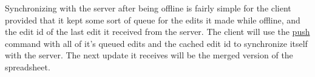 Synchronizing with the server after being offline is fairly simple for the client provided that it kept some sort of queue for the edits it made while offline, and the edit id of the last edit it received from the server. The client will use the \hyperref[sec:message:push]{push} command with all of it’s queued edits and the cached edit id to synchronize itself with the server. The next update it receives will be the merged version of the spreadsheet.